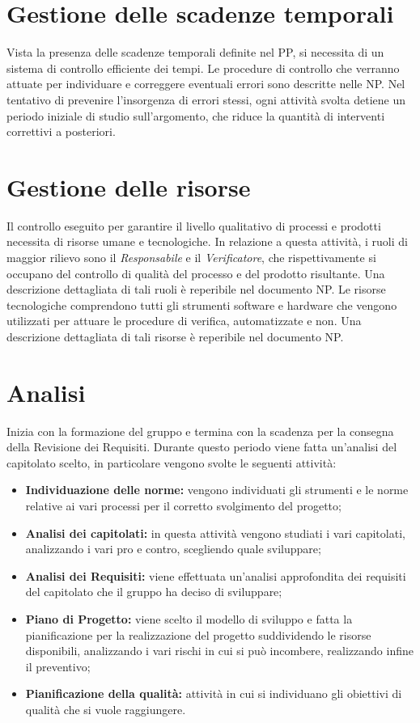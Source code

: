 \documentclass[../PianodiProgetto.tex]{subfiles}
\begin{document}
	\section{Gestione delle scadenze temporali}
	
	Vista la presenza delle scadenze temporali definite nel PP, si necessita di un sistema di controllo efficiente dei tempi. Le procedure di controllo che verranno attuate per individuare e correggere eventuali errori sono descritte
	nelle NP. Nel tentativo di prevenire l'insorgenza di errori stessi, ogni attività svolta detiene un periodo iniziale di
	studio sull'argomento, che riduce la quantità di interventi correttivi a posteriori.
	
	\section{Gestione delle risorse}
	
	Il controllo eseguito per garantire il livello qualitativo di processi e prodotti necessita di risorse umane e tecnologiche. In relazione a questa attività, i ruoli di maggior rilievo sono il \textit{Responsabile} e il \textit{Verificatore}, che rispettivamente si occupano del controllo di qualità del processo e del prodotto risultante. Una descrizione dettagliata di tali ruoli è reperibile nel documento NP. 
	Le risorse tecnologiche comprendono tutti gli strumenti software e hardware che vengono utilizzati per attuare le procedure di verifica, automatizzate e non. Una descrizione dettagliata di tali risorse è reperibile nel documento NP. 
	
	\section{Analisi}
	Inizia con la formazione del gruppo e termina con la scadenza per la consegna della Revisione dei Requisiti.
	Durante questo periodo viene fatta un'analisi del capitolato scelto, in particolare vengono svolte le seguenti attività:
	\begin{itemize}
		\item \textbf{Individuazione delle norme:} vengono individuati gli strumenti e le norme relative ai vari processi per il corretto svolgimento del progetto;
		\item \textbf{Analisi dei capitolati:} in questa attività vengono studiati i vari capitolati, analizzando i vari pro e contro, scegliendo quale sviluppare;
		\item \textbf{Analisi dei Requisiti:} viene effettuata un'analisi approfondita dei requisiti del capitolato che il gruppo ha deciso di sviluppare;
		\item \textbf{Piano di Progetto:} viene scelto il modello di sviluppo e fatta la pianificazione per la realizzazione del progetto suddividendo le risorse disponibili, analizzando i vari rischi in cui si può incombere, realizzando infine il preventivo; 
		\item \textbf{Pianificazione della qualità:} attività in cui si individuano gli obiettivi di qualità che si vuole raggiungere.	
	\end{itemize}
	
\end{document}
